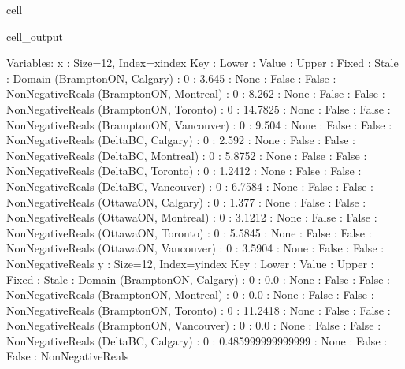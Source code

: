 \documentclass[letterpaper,10pt,english]{jupyterBook}
\begin{document}
\begin{sphinxuseclass}{cell}
\begin{sphinxVerbatimOutput}
\begin{sphinxuseclass}{cell_output}
\begin{sphinxVerbatim}[commandchars=\\\{\}]
  Variables:
    x : Size=12, Index=x\PYGZus{}index
        Key                          : Lower : Value   : Upper : Fixed : Stale : Domain
          (\PYGZsq{}Brampton\PYGZhy{}ON\PYGZsq{}, \PYGZsq{}Calgary\PYGZsq{}) :     0 :   3.645 :  None : False : False : NonNegativeReals
         (\PYGZsq{}Brampton\PYGZhy{}ON\PYGZsq{}, \PYGZsq{}Montreal\PYGZsq{}) :     0 :   8.262 :  None : False : False : NonNegativeReals
          (\PYGZsq{}Brampton\PYGZhy{}ON\PYGZsq{}, \PYGZsq{}Toronto\PYGZsq{}) :     0 : 14.7825 :  None : False : False : NonNegativeReals
        (\PYGZsq{}Brampton\PYGZhy{}ON\PYGZsq{}, \PYGZsq{}Vancouver\PYGZsq{}) :     0 :   9.504 :  None : False : False : NonNegativeReals
             (\PYGZsq{}Delta\PYGZhy{}BC\PYGZsq{}, \PYGZsq{}Calgary\PYGZsq{}) :     0 :   2.592 :  None : False : False : NonNegativeReals
            (\PYGZsq{}Delta\PYGZhy{}BC\PYGZsq{}, \PYGZsq{}Montreal\PYGZsq{}) :     0 :  5.8752 :  None : False : False : NonNegativeReals
             (\PYGZsq{}Delta\PYGZhy{}BC\PYGZsq{}, \PYGZsq{}Toronto\PYGZsq{}) :     0 :  1.2412 :  None : False : False : NonNegativeReals
           (\PYGZsq{}Delta\PYGZhy{}BC\PYGZsq{}, \PYGZsq{}Vancouver\PYGZsq{}) :     0 :  6.7584 :  None : False : False : NonNegativeReals
            (\PYGZsq{}Ottawa\PYGZhy{}ON\PYGZsq{}, \PYGZsq{}Calgary\PYGZsq{}) :     0 :   1.377 :  None : False : False : NonNegativeReals
           (\PYGZsq{}Ottawa\PYGZhy{}ON\PYGZsq{}, \PYGZsq{}Montreal\PYGZsq{}) :     0 :  3.1212 :  None : False : False : NonNegativeReals
            (\PYGZsq{}Ottawa\PYGZhy{}ON\PYGZsq{}, \PYGZsq{}Toronto\PYGZsq{}) :     0 :  5.5845 :  None : False : False : NonNegativeReals
          (\PYGZsq{}Ottawa\PYGZhy{}ON\PYGZsq{}, \PYGZsq{}Vancouver\PYGZsq{}) :     0 :  3.5904 :  None : False : False : NonNegativeReals
    y : Size=12, Index=y\PYGZus{}index
        Key                          : Lower : Value             : Upper : Fixed : Stale : Domain
          (\PYGZsq{}Brampton\PYGZhy{}ON\PYGZsq{}, \PYGZsq{}Calgary\PYGZsq{}) :     0 :               0.0 :  None : False : False : NonNegativeReals
         (\PYGZsq{}Brampton\PYGZhy{}ON\PYGZsq{}, \PYGZsq{}Montreal\PYGZsq{}) :     0 :               0.0 :  None : False : False : NonNegativeReals
          (\PYGZsq{}Brampton\PYGZhy{}ON\PYGZsq{}, \PYGZsq{}Toronto\PYGZsq{}) :     0 :           11.2418 :  None : False : False : NonNegativeReals
        (\PYGZsq{}Brampton\PYGZhy{}ON\PYGZsq{}, \PYGZsq{}Vancouver\PYGZsq{}) :     0 :               0.0 :  None : False : False : NonNegativeReals
             (\PYGZsq{}Delta\PYGZhy{}BC\PYGZsq{}, \PYGZsq{}Calgary\PYGZsq{}) :     0 : 0.485999999999999 :  None : False : False : NonNegativeReals

\end{sphinxVerbatim}
\end{sphinxuseclass}
\end{sphinxVerbatimOutput}
\end{sphinxuseclass}
\end{document}
